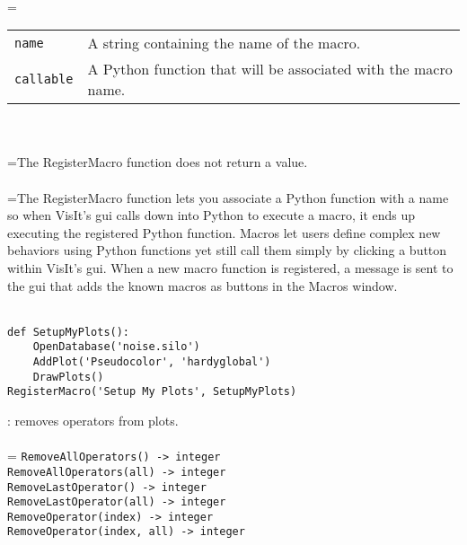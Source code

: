 \documentclass[10pt,a4paper]{report}
\begin{document}
 \\ 
\hangindent=\parindent 
\begin{tabular}{lp{9cm}}
\verb!name! & A string containing the name of the macro. \\
\verb!callable! & A Python function that will be associated with the macro name. \\
\end{tabular} \\[-2mm]


 \\ 
\hangindent=\parindent The RegisterMacro function does not return a value. \\[-3mm] 

 \\ 
\hangindent=\parindent The RegisterMacro function lets you associate a Python function with a name so when VisIt's gui calls down into Python to execute a macro, it ends up executing the registered Python function. Macros let users define complex new behaviors using Python functions yet still call them simply by clicking a button within VisIt's gui. When a new macro function is registered, a  message is sent to the gui that adds the known macros as buttons in the Macros window. \\[-3mm] 

\\[-6mm]
\begin{verbatim}def SetupMyPlots():
    OpenDatabase('noise.silo')
    AddPlot('Pseudocolor', 'hardyglobal')
    DrawPlots()
RegisterMacro('Setup My Plots', SetupMyPlots)
\end{verbatim}
\newpage


{}
: removes operators from plots.\\[-3mm]

 \\ 
\hangindent=\parindent 
\verb!RemoveAllOperators() -> integer!\\ 
\verb!RemoveAllOperators(all) -> integer!\\ 
\verb!RemoveLastOperator() -> integer!\\ 
\verb!RemoveLastOperator(all) -> integer!\\ 
\verb!RemoveOperator(index) -> integer!\\ 
\verb!RemoveOperator(index, all) -> integer!\\ [-3mm]
\end{document}
